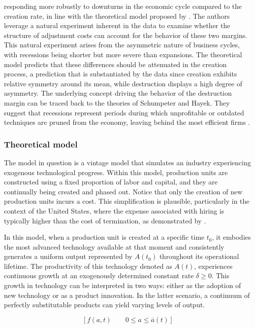 \documentclass[12pt]{report}
\begin{document}
responding more robustly to downturns in the economic cycle compared to the creation rate, in line with the theoretical
model proposed by \cite{CabHarm94} \cite{CabHarm94}. The authors leverage a natural experiment inherent in the data
to examine whether the structure of adjustment costs can account for the behavior of these two margins. This natural
experiment arises from the asymmetric nature of business cycles, with recessions being shorter but more severe than
expansions. The theoretical model predicts that these differences should be attenuated in the creation process, a
prediction that is substantiated by the data since creation exhibits relative symmetry around its mean, while
destruction displays a high degree of asymmetry.
The underlying concept driving the behavior of the destruction margin can be traced back to the theories of Schumpeter
and Hayek.  They suggest that recessions represent periods during which unprofitable or outdated techniques are pruned
from the economy, leaving behind the most efficient firms \citet{HaCa07}.
\subsubsection{Theoretical model}
The model in question is a vintage model that simulates an industry experiencing exogenous technological progress.
Within this model, production units are constructed using a fixed proportion of labor and capital, and they are
continually being created and phased out. Notice that only the creation of new production units
incurs a cost. This simplification is plausible, particularly in the context of the United States, where the expense
associated with hiring is typically higher than the cost of termination, as demonstrated by 
 \cite{AbdKra03}. 
\par
In this model, when a production unit is created at a specific time \(t_0\), it embodies the most advanced technology
available at that moment and consistently generates a uniform output represented by \(A(t_0)\) throughout its
operational lifetime. The productivity of this technology denoted as \(A(t)\), experiences continuous growth at an
exogenously determined constant rate \(\delta \ge 0 \). This growth in technology can be interpreted in two ways: either
as the adoption of new technology or as a product innovation. In the latter scenario, a continuum of perfectly
substitutable products can yield varying levels of output.

\[\left[ f(a,t) \qquad 0\leq a \leq \overline{a}(t) \right]\]
\end{document}
